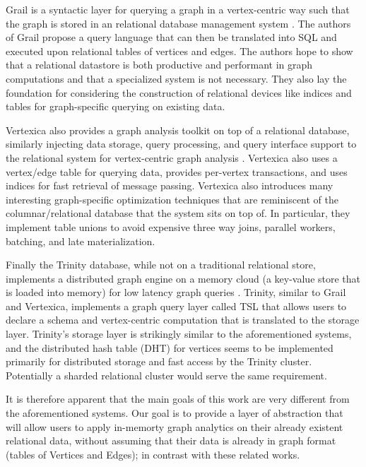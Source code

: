\documentclass[11pt,letterpaper]{article}
\begin{document}
Grail \cite{fan_case_2015} is a syntactic layer for querying a graph in a vertex-centric way such that the graph is stored in an relational database management system
\cite{fan_case_2015}. The authors of Grail propose a query language that can then be translated into SQL and executed upon relational tables of vertices and edges. The authors hope to show that a relational datastore is both productive and performant in graph computations and that a specialized system is not necessary. They also lay the foundation for considering the construction of relational devices like indices and tables for graph-specific querying on existing data.

Vertexica \cite{jindal_vertexica:_2014} also provides a graph analysis toolkit on top of a relational database, similarly injecting data storage, query processing, and query interface support to the relational system for vertex-centric graph analysis \cite{jindal_vertexica:_2014}. Vertexica also uses a vertex/edge table for querying data, provides per-vertex transactions, and uses indices for fast retrieval of message passing. Vertexica also introduces many interesting graph-specific optimization techniques that are reminiscent of the columnar/relational database that the system sits on top of. In particular, they implement table unions to avoid expensive three way joins, parallel workers, batching, and late materialization.

Finally the Trinity \cite{shao_trinity:_2013} database, while not on a traditional relational store, implements a distributed graph engine on a memory cloud (a key-value store that is loaded into memory) for low latency graph queries \cite{shao_trinity:_2013}. Trinity, similar to Grail and Vertexica, implements a graph query layer called TSL that allows users to declare a schema and vertex-centric computation that is translated to the storage layer. Trinity's storage layer is strikingly similar to the aforementioned systems, and the distributed hash table (DHT) for vertices seems to be implemented primarily for distributed storage and fast access by the Trinity cluster. Potentially a sharded relational cluster would serve the same requirement.

It is therefore apparent that the main goals of this work are very different from the aforementioned systems. Our goal is to provide a layer of abstraction that will allow users to apply in-memorty graph analytics on their already existent relational data, without assuming that their data is already in graph format (tables of Vertices and Edges); in contrast with these related works.
\end{document}
